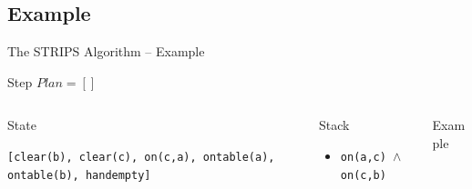 \documentclass[presentation]{beamer}\mode<presentation>{\usetheme{AMSBolognaFC}}
\begin{document}
\subsection{Example}

\newcommand{\nextStripsExampleStep}{\stepcounter{StripsExampleStep}\theStripsExampleStep}

\begin{frame}[c]{The STRIPS Algorithm -- Example}
    \small

    \begin{exampleblock}{Step \theStripsExampleStep \hfill $Plan = []$}
        \begin{columns}[t]
            \begin{column}{.30\linewidth}\centering
                State

                \texttt{[clear(b), clear(c), on(c,a), ontable(a), ontable(b), handempty]}
            \end{column}
            \begin{column}{.50\linewidth}\centering
                Stack
                \begin{itemize}
                    \item \texttt{on(a,c) $\wedge$ on(c,b)}
                \end{itemize}
            \end{column}
            \begin{column}{.10\linewidth}\centering
                Example

                
            \end{column}
        \end{columns}
    \end{exampleblock}

\end{frame}
\end{document}
